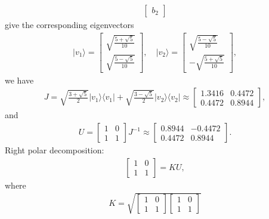 \documentclass[en]{sol-man}
\begin{document}
\begin{sol}
\begin{align}
\begin{bmatrix}
            b_2
        \end{bmatrix}
    \end{align}
    give the corresponding eigenvectors
    \begin{align}
        \lvert v_1\rangle=\begin{bmatrix}
            \sqrt{\frac{5+\sqrt{5}}{10}}\\
            \sqrt{\frac{5-\sqrt{5}}{10}}
        \end{bmatrix},\quad\lvert v_2\rangle=\begin{bmatrix}
            \sqrt{\frac{5-\sqrt{5}}{10}}\\
            -\sqrt{\frac{5+\sqrt{5}}{10}}
        \end{bmatrix},
    \end{align}
    we have
    \begin{align}
        J=\sqrt{\frac{3+\sqrt{5}}{2}}\lvert v_1\rangle\langle v_1\rvert+\sqrt{\frac{3-\sqrt{5}}{2}}\lvert v_2\rangle\langle v_2\rvert\approx\begin{bmatrix}
            1.3416&0.4472\\
            0.4472&0.8944
        \end{bmatrix},
    \end{align}
    and
    \begin{align}
        U=\begin{bmatrix}
            1&0\\
            1&1
        \end{bmatrix}J^{-1}\approx\begin{bmatrix}
            0.8944&-0.4472\\
            0.4472&0.8944
        \end{bmatrix}.
    \end{align}
    Right polar decomposition:
    \begin{align}
        \begin{bmatrix}
            1&0\\
            1&1
        \end{bmatrix}=KU,
    \end{align}
    where
    \begin{align}
        K=\sqrt{\begin{bmatrix}
            1&0\\
            1&1
        \end{bmatrix}\begin{bmatrix}
            1&0\\
            1&1

\end{bmatrix}}
\end{align}
\end{sol}
\end{document}
